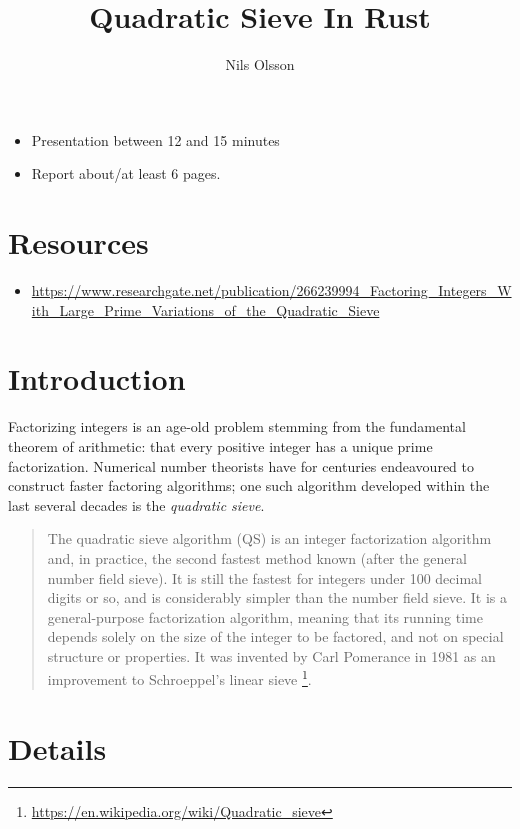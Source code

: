 \documentclass{article}
\begin{document}
\title{Quadratic Sieve In Rust}
\author{Nils Olsson}
\maketitle
\tableofcontents

\begin{itemize}
    \item Presentation between 12 and 15 minutes
    \item Report about/at least 6 pages.
\end{itemize}

\section*{Resources}
\begin{itemize}
    \item
        \url{https://www.researchgate.net/publication/266239994_Factoring_Integers_With_Large_Prime_Variations_of_the_Quadratic_Sieve}
\end{itemize}

\section{Introduction}

Factorizing integers is an age-old problem stemming from the fundamental theorem
of arithmetic: that every positive integer has a unique prime factorization.
Numerical number theorists have for centuries endeavoured to construct faster
factoring algorithms; one such algorithm developed within the last several
decades is the \emph{quadratic sieve}.
\begin{quote}
    The quadratic sieve algorithm (QS) is an integer factorization algorithm
    and, in practice, the second fastest method known (after the general number
    field sieve). It is still the fastest for integers under 100 decimal digits
    or so, and is considerably simpler than the number field sieve. It is a
    general-purpose factorization algorithm, meaning that its running time
    depends solely on the size of the integer to be factored, and not on special
    structure or properties. It was invented by Carl Pomerance in 1981 as an
    improvement to Schroeppel's linear sieve
    \footnote{\url{https://en.wikipedia.org/wiki/Quadratic\_sieve}}.
\end{quote}

\pagebreak
\section{Details}
\end{document}

